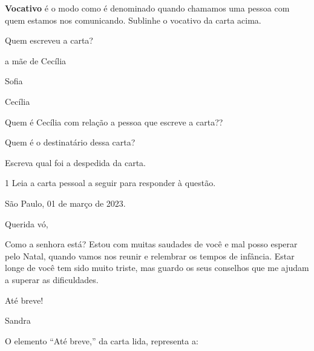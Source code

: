 \begin{escolha}
\item \textbf{Vocativo} é o modo como é denominado quando chamamos uma
pessoa com quem estamos nos comunicando. Sublinhe o vocativo da carta
acima.

\item Quem escreveu a carta?

\begin{boxlist}
 a mãe de Cecília 

 Sofia

 Cecília
\end{boxlist}

\item Quem é Cecília com relação a pessoa que escreve a carta??


\item Quem é o destinatário dessa carta?


\item Escreva qual foi a despedida da carta. 

\end{escolha}


\num{1} Leia a carta pessoal a seguir para responder à questão.


\begin{mdframed}[linewidth=10pt,linecolor=salmao!20,backgroundcolor=salmao!20,roundcorner=20pt]
\begin{flushright}
São Paulo, 01 de março de 2023.
\end{flushright}

Querida vó,

Como a senhora está? Estou com muitas saudades de você e mal posso
esperar pelo Natal, quando vamos nos reunir e relembrar os tempos de
infância. Estar longe de você tem sido muito triste, mas guardo os seus
conselhos que me ajudam a superar as dificuldades.

\begin{flushright}
Até breve!

Sandra
\end{flushright}
\end{mdframed}

O elemento ``Até breve,'' da carta lida, representa a:

